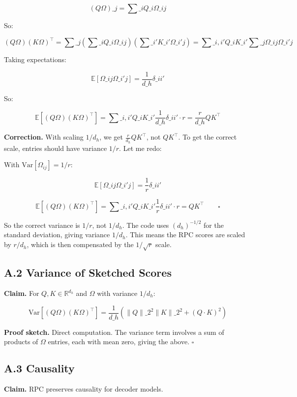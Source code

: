\[
(Q\Omega)\_j = \sum\_i Q\_i \Omega\_{ij}
\]

So:

\[
(Q\Omega)(K\Omega)^\top = \sum\_j \left(\sum\_i Q\_i \Omega\_{ij}\right) \left(\sum\_{i'} K\_{i'} \Omega\_{i'j}\right)
= \sum\_{i, i'} Q\_i K\_{i'} \sum\_j \Omega\_{ij} \Omega\_{i'j}
\]

Taking expectations:

\[
\mathbb{E}[\Omega\_{ij} \Omega\_{i'j}] = \frac{1}{d\_h} \delta\_{ii'}
\]

So:

\[
\mathbb{E}[(Q\Omega)(K\Omega)^\top] = \sum\_{i, i'} Q\_i K\_{i'} \frac{1}{d\_h} \delta\_{ii'} \cdot r = \frac{r}{d\_h} Q K^\top
\]

\textbf{Correction.} With scaling $1/d_h$, we get $\frac{r}{d_h} Q K^\top$, not $Q K^\top$. To get the correct scale, entries should have variance $1/r$. Let me redo:

With $\text{Var}[\Omega_{ij}] = 1/r$:

\[
\mathbb{E}[\Omega\_{ij} \Omega\_{i'j}] = \frac{1}{r} \delta\_{ii'}
\]

\[
\mathbb{E}[(Q\Omega)(K\Omega)^\top] = \sum\_{i, i'} Q\_i K\_{i'} \frac{1}{r} \delta\_{ii'} \cdot r = Q K^\top \qquad \square
\]

So the correct variance is $1/r$, not $1/d_h$. The code uses $(d_h)^{-1/2}$ for the standard deviation, giving variance $1/d_h$. This means the RPC scores are scaled by $r/d_h$, which is then compensated by the $1/\sqrt{r}$ scale.

\subsection{A.2 Variance of Sketched Scores}

\textbf{Claim.} For $Q, K \in \mathbb{R}^{d_h}$ and $\Omega$ with variance $1/d_h$:

\[
\text{Var}[(Q\Omega)(K\Omega)^\top] = \frac{1}{d\_h} \left(\|Q\|\_2^2 \|K\|\_2^2 + (Q \cdot K)^2\right)
\tag{A.2}
\]

\textbf{Proof sketch.} Direct computation. The variance term involves a sum of products of $\Omega$ entries, each with mean zero, giving the above. $\square$

\subsection{A.3 Causality}

\textbf{Claim.} RPC preserves causality for decoder models.

